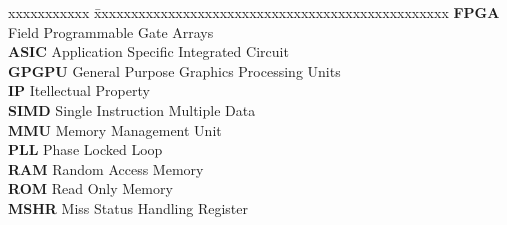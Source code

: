\documentclass[12pt]{gatech-thesis}
\begin{document}
\begin{tabbing}
xxxxxxxxxxx \= xxxxxxxxxxxxxxxxxxxxxxxxxxxxxxxxxxxxxxxxxxxxxxxx \kill
\textbf{FPGA}   \> Field Programmable Gate Arrays \\
\textbf{ASIC}   \> Application Specific Integrated Circuit \\
\textbf{GPGPU}  \> General Purpose Graphics Processing Units\\
\textbf{IP}  \> Itellectual Property\\
\textbf{SIMD}  \> Single Instruction Multiple Data\\
\textbf{MMU}  \> Memory Management Unit\\
\textbf{PLL}  \> Phase Locked Loop\\
\textbf{RAM}  \> Random Access Memory\\
\textbf{ROM}  \> Read Only Memory\\
\textbf{MSHR}  \> Miss Status Handling Register\\
\end{tabbing}
\pagebreak
\newcommand{\figput}[5][1.0\linewidth]{
\begin{figure}[!hbtp]
\centering
\texttt{[image: myfigures/\#2]}
\caption{#5 \label{fig:#2}}
\end{figure}
}





\nocite{*}

\begin{postliminary}
\end{postliminary}
\end{document}
